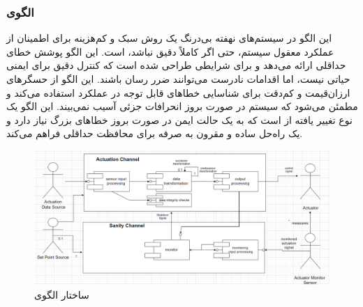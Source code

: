 \subsubsection{الگوی }
\label{archSafeSanityChkSec}
\begin{RTL}
این الگو \cite{ref4} در سیستم‌های نهفته بی‌درنگ یک روش سبک و کم‌هزینه
برای اطمینان از عملکرد معقول سیستم، حتی اگر کاملاً دقیق نباشد، است.
این الگو پوشش خطای حداقلی ارائه می‌دهد و برای شرایطی طراحی شده است که
کنترل دقیق برای ایمنی حیاتی نیست، اما اقدامات نادرست می‌توانند ضرر رسان باشند.
این الگو از حسگرهای ارزان‌قیمت و کم‌دقت برای شناسایی خطاهای قابل توجه
در عملکرد استفاده می‌کند و مطمئن می‌شود که سیستم در
صورت بروز انحرافات جزئی آسیب نمی‌بیند. این الگو یک نوع تغییر یافته از
 است که به یک حالت ایمن در صورت
بروز خطاهای بزرگ نیاز دارد و یک راه‌حل ساده و مقرون به صرفه
برای محافظت حداقلی فراهم می‌کند.
\end{RTL}
\begin{figure}[h!]
\centering
\includegraphics[scale=0.5]{images/third/sanityCheck.png}
\caption{ساختار الگوی }
\end{figure}